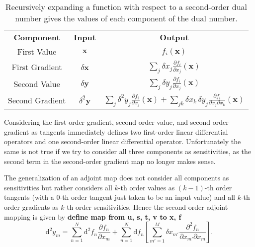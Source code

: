 \begin{table*}[t!]
	\centering
	\renewcommand{\arraystretch}{2}
	\begin{tabular}{ccc}
	\rowcolor[gray]{0.9} \textbf{Component} & \textbf{Input} & \textbf{Output} \\
	First Value & 
	$\mathbf{x}$ & 
	$f_{i} \! \left( \mathbf{x} \right)$ 
	\\
	\rowcolor[gray]{0.9} 
	First Gradient & 
	$\delta \mathbf{x}$ &
	$\displaystyle \sum_{j} \delta x_{j}  \frac{ \partial f_{i} }{ \partial x_{j} } \! \left( \mathbf{x} \right)$
	\\
	Second Value & 
	$\delta \mathbf{y} $ & 
	$\displaystyle \sum_{j} \delta y_{j} \frac{ \partial f_{i} }{ \partial x_{j} } \! \left( \mathbf{x} \right)$
	\\
	\rowcolor[gray]{0.9} 
	Second Gradient & 
	$\delta^{2} \mathbf{y} $ & 
	$\displaystyle \sum_{j} \delta^{2} y_{j} \frac{ \partial f_{i} }{ \partial x_{j} } \! \left( \mathbf{x} \right)
	+ \sum_{jk} \delta x_{k} \, \delta y_{j}
	\frac{ \partial f_{i} }{ \partial x_{j} \partial x_{k} } \! \left( \mathbf{x} \right)$
	\\
	\end{tabular}
	\caption{Recursively expanding a function with respect to a second-order dual number 
	gives the values of each component of the dual number.
	\label{tab:secondOrder}}
\end{table*}

Considering the first-order gradient, second-order value, and second-order gradient as tangents 
immediately defines two first-order linear differential operators and one second-order linear 
differential operator.  Unfortunately the same is not true if we try to consider all three components
as sensitivities, as the second term in the second-order gradient map no longer makes
sense.  

The generalization of an adjoint map does not consider all components as sensitivities but rather
considers all $k$-th order values as $(k - 1)$-th order tangents (with a $0$-th order tangent just
taken to be an input value) and all $k$-th order gradients as $k$-th order sensitivities.  Hence
the second-order adjoint mapping is given by
\textbf{define map from u, s, t, v to x, f}
%
\begin{equation*}
\mathrm{d}^{2} y_{m}
= \sum_{n = 1}^{N} \mathrm{d}^{2} f_{n} \frac{ \partial f_{n} }{ \partial x_{m} }
+ \sum_{n = 1}^{N} \mathrm{d} f_{n} 
\left[ \sum_{m'=1}^{M} \delta x_{m'} \frac{ \partial^{2} f_{n} }{ \partial x_{m'} \partial x_{m} } \right].
\end{equation*}

